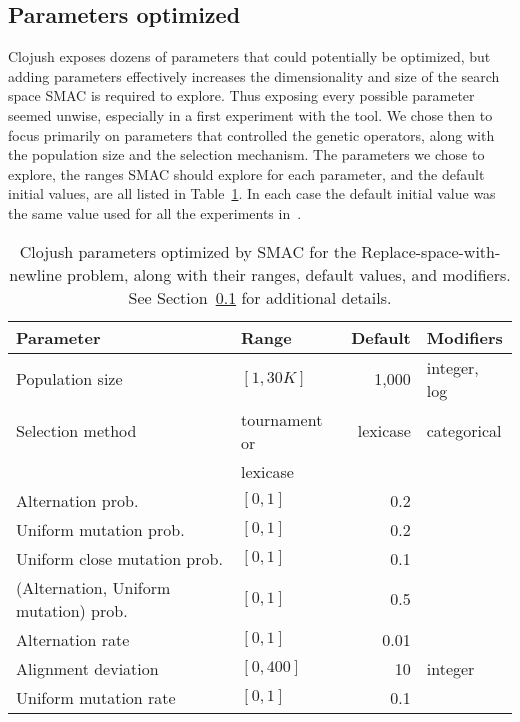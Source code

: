 \documentclass{llncs}
\begin{document}
\subsection{Parameters optimized}
\label{sec:parametersOptimized}

Clojush exposes dozens of parameters that could potentially be optimized, but
adding parameters effectively increases the dimensionality and size of the
search space SMAC is required to explore. Thus exposing every possible parameter
seemed unwise, especially in a first experiment with the tool. We chose then
to focus primarily on parameters that controlled the genetic operators, along
with the population size and the selection mechanism. The parameters we chose 
to explore, the ranges SMAC should explore for each parameter, and the 
default initial values, are all listed in Table~\ref{tab:clojushParameters}.
In each case the default initial value was the same value used for all the
experiments in~\cite{Helmuth:GECCO:2015}.

\begin{table}
	\begin{center}
	\begin{tabular}{l@{\quad} @{\enskip}l@{\quad} @{\enskip}r@{\quad} @{\enskip}l}
		Parameter & Range & Default & Modifiers \\
		\hline
		Population size & $[1, 30K]$ & 1,000 & integer, log \\
		Selection method & tournament or & lexicase & categorical \\
		& \quad lexicase \\
		\hline
		Alternation prob. & $[0, 1]$ & 0.2 \\
		Uniform mutation prob. & $[0, 1]$ & 0.2 \\
		Uniform close mutation prob. & $[0, 1]$ & 0.1 \\
		(Alternation, Uniform mutation) prob. & $[0, 1]$ & 0.5 \\
		\hline
		Alternation rate & $[0, 1]$ & 0.01 \\
		Alignment deviation & $[0, 400]$ & 10 & integer \\
		\hline
		Uniform mutation rate & $[0, 1]$ & 0.1
	\end{tabular}
	\end{center}
	\caption{Clojush parameters optimized by SMAC for the Replace-space-with-newline problem, along with their ranges, 
		default values, and modifiers. See Section~\ref{sec:parametersOptimized} for additional details.}
	\label{tab:clojushParameters}
\end{table}
\end{document}
